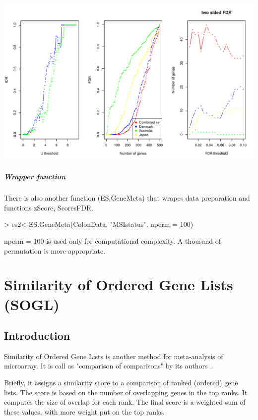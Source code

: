 \documentclass[a4paper]{report}
\begin{document}
\includegraphics{MAMA_full-022}
\paragraph{Wrapper function}
There is also another function ({\ttfamily ES.GeneMeta}) that wrapes data preparation and functions {\ttfamily zScore}, {\ttfamily ScoresFDR}.
\begin{Schunk}
\begin{Sinput}
> es2<-ES.GeneMeta(ColonData, "MSIstatus", nperm = 100)
\end{Sinput}
\end{Schunk}
{\ttfamily nperm = 100} is used only for computational complexity. A thousand of permutation is more appropriate.  

\chapter{Similarity of Ordered Gene Lists (SOGL)}
\section*{Introduction}
Similarity of Ordered Gene Lists is another method for meta-analysis of microarray. It is call as "comparison of comparisons" by its authors \cite{Yang2006}. \par
Briefly, it assigns a similarity score to a comparison of ranked (ordered) gene lists. The score is based on the number of overlapping genes in the top ranks. It computes the size of overlap for each rank. The final score is a weighted sum of these values, with more weight put on the top ranks. \par
\end{document}
